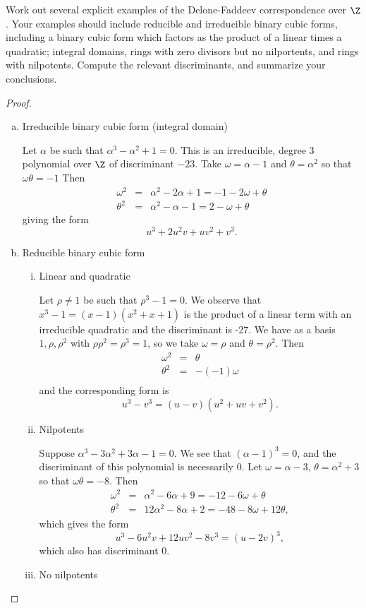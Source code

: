 \documentclass[10pt]{amsart}
\begin{document}
\setcounter{thm}{8}
\begin{thm}[15 Points]
  Work out several explicit examples of the Delone-Faddeev correspondence over $\Z$.
  Your examples should include reducible and irreducible binary cubic forms, including a binary cubic form which factors as the product of a linear times a quadratic; integral domains, rings with zero divisors but no nilportents, and rings with nilpotents.
  Compute the relevant discriminants, and summarize your conclusions.
  
  \begin{proof}
    \begin{enumerate}[(a)]
    \item Irreducible binary cubic form (integral domain)
      
      Let $\alpha$ be such that $\alpha^3 - \alpha^2 + 1 = 0$.
      This is an irreducible, degree 3 polynomial over $\Z$ of discriminant $-23$.
      Take $\omega = \alpha - 1$ and $\theta = \alpha^2$ so that $\omega\theta = -1$
      Then 
      \begin{eqnarray*}
        \omega^2 &=& \alpha^2 - 2\alpha + 1 = -1 - 2\omega + \theta\\
        \theta^2 &=& \alpha^2 - \alpha - 1 = 2 - \omega + \theta
      \end{eqnarray*}
      giving the form
      $$u^3 + 2u^2v + uv^2 + v^3.$$
    \item Reducible binary cubic form
      \begin{enumerate}[(i)]
      \item
        Linear and quadratic
        
        Let $\rho \neq 1$ be such that $\rho^3 - 1 = 0$.
        We observe that $x^3 - 1 = (x - 1)(x^2 + x + 1)$ is the product of a linear term with an irreducible quadratic and the discriminant is -27.
        We have as a basis ${1, \rho, \rho^2}$ with $\rho\rho^2 = \rho^3 = 1$, so we take $\omega = \rho$ and $\theta = \rho^2$.
        Then
        \begin{eqnarray*}
          \omega^2 &=& \theta\\
          \theta^2 &=& -(-1)\omega\\
        \end{eqnarray*}
        and the corresponding form is
        $$u^3 - v^3 = (u - v)(u^2 + uv + v^2).$$
      \item Nilpotents
        
        Suppose $\alpha^3 - 3\alpha^2 + 3\alpha - 1 = 0$.
        We see that $(\alpha - 1)^3 = 0$, and the discriminant of this polynomial is necessarily 0.
        Let $\omega = \alpha - 3$, $\theta = \alpha^2 + 3$ so that $\omega\theta = -8$.
        Then 
        \begin{eqnarray*}
          \omega^2 &=& \alpha^2 - 6\alpha + 9  = -12 - 6\omega + \theta\\
          \theta^2 &=& 12\alpha^2 -8\alpha + 2 = -48 -8\omega + 12\theta,
        \end{eqnarray*}
        which gives the form
        $$u^3 - 6u^2v + 12uv^2 - 8v^3 = (u - 2v)^3,$$
        which also has discriminant 0.
      \item No nilpotents
        

\end{enumerate}
\end{enumerate}
\end{proof}
\end{thm}
\end{document}
